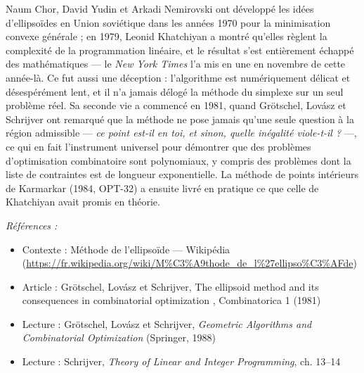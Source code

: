 \documentclass[11pt]{article}
\newenvironment{refs}{\par\small\noindent\emph{Références :}\begin{itemize}\setlength\itemsep{0pt}}{\end{itemize}\normalsize}
\begin{document}
\noindent Naum Chor, David Yudin et Arkadi Nemirovski ont développé les idées d'ellipsoïdes en Union soviétique dans les années 1970 pour la minimisation convexe générale ; en 1979, Leonid Khatchiyan a montré qu'elles règlent la complexité de la programmation linéaire, et le résultat s'est entièrement échappé des mathématiques --- le \textit{New York Times} l'a mis en une en novembre de cette année-là. Ce fut aussi une déception : l'algorithme est numériquement délicat et désespérément lent, et il n'a jamais délogé la méthode du simplexe sur un seul problème réel. Sa seconde vie a commencé en 1981, quand Grötschel, Lovász et Schrijver ont remarqué que la méthode ne pose jamais qu'une seule question à la région admissible --- \textit{ce point est-il en toi, et sinon, quelle inégalité viole-t-il ?} ---, ce qui en fait l'instrument universel pour démontrer que des problèmes d'optimisation combinatoire sont polynomiaux, y compris des problèmes dont la liste de contraintes est de longueur exponentielle. La méthode de points intérieurs de Karmarkar (1984, OPT-32) a ensuite livré en pratique ce que celle de Khatchiyan avait promis en théorie.

\begin{refs}
\item Contexte : Méthode de l'ellipsoïde --- Wikipédia (\url{https://fr.wikipedia.org/wiki/M%C3%A9thode_de_l%27ellipso%C3%AFde})
\item Article : Grötschel, Lovász et Schrijver, \og{} The ellipsoid method and its consequences in combinatorial optimization \fg{}, Combinatorica 1 (1981)
\item Lecture : Grötschel, Lovász et Schrijver, \textit{Geometric Algorithms and Combinatorial Optimization} (Springer, 1988)
\item Lecture : Schrijver, \textit{Theory of Linear and Integer Programming}, ch. 13--14
\end{refs}

\bigskip
\end{document}
